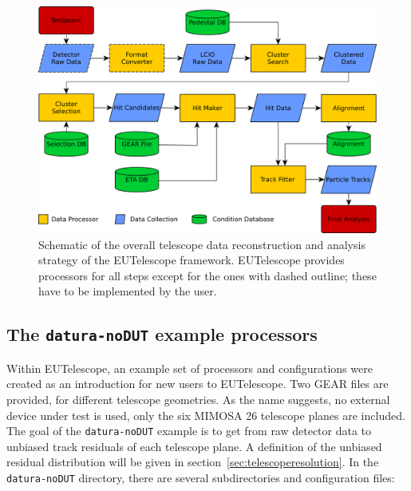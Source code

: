 \begin{figure}[tbp]
	\center
	\includegraphics[width=.9\textwidth]{figures/eutel-strategy.png}
	\caption[The EUTelescope data analysis strategy]{Schematic of the overall telescope data reconstruction and analysis strategy of the EUTelescope framework. 
	EUTelescope provides processors for all steps except for the ones with dashed outline; these have to be implemented by the user.}
	\label{fig:offline:strategy}
\end{figure}

\subsection{The \texttt{datura-noDUT} example
processors}\label{sec:datura-nodut}

Within EUTelescope, an example set of processors and configurations were created
as an introduction for new users to EUTelescope. Two GEAR files are provided,
for different telescope geometries. As the name suggests, no external device
under test is used, only the six MIMOSA 26 telescope planes are included. The
goal of the \texttt{datura-noDUT} example is to get from raw detector data to
unbiased track residuals of each telescope plane. A definition of the unbiased
residual distribution will be given in section~\ref{sec:telescoperesolution}. In
the \texttt{datura-noDUT} directory, there are several subdirectories and
configuration files:\\

